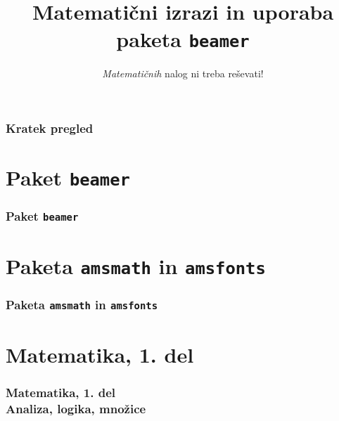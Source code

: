 \documentclass{beamer}
\begin{document}

\title{Matematični izrazi in uporaba paketa \texttt{beamer}}
\subtitle{\emph{Matematičnih} nalog ni treba reševati!}
\date{}
\frame{\titlepage}
\begin{frame}
    \frametitle{Kratek pregled}
    \tableofcontents
\end{frame}
\section{Paket \texttt{beamer}}

\begin{frame}

\frametitle{Paket \texttt{beamer}}
\end{frame}
\section{Paketa \texttt{amsmath} in \texttt{amsfonts}}

\begin{frame}

\frametitle{Paketa \texttt{amsmath} in \texttt{amsfonts}}
\end{frame}
\section[Matematika, 1. del\\\large{Analiza, logika, množice}]{Matematika, 1. del}

\begin{frame}

\frametitle{Matematika, 1. del\\\large{Analiza, logika, množice}}
\end{frame}
\end{document}
